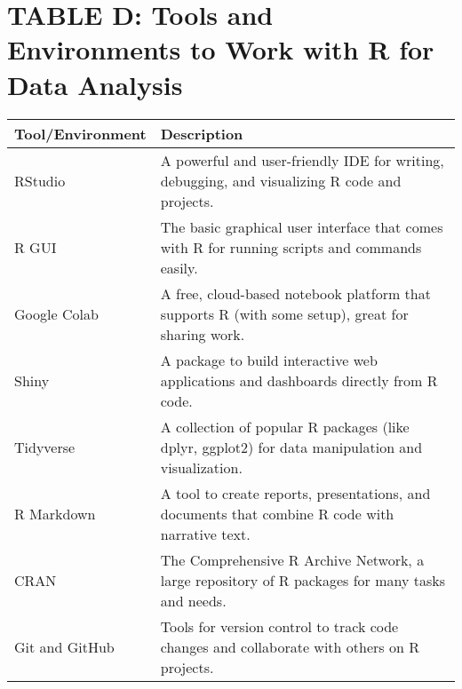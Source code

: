 \section*{TABLE D: Tools and Environments to Work with R for Data Analysis}

\begin{table}[h!]
\centering
\begin{tabular}{|p{4cm}|p{10cm}|}
\hline
\textbf{Tool/Environment} & \textbf{Description} \\
\hline
RStudio & A powerful and user-friendly IDE for writing, debugging, and visualizing R code and projects. \\
\hline
R GUI & The basic graphical user interface that comes with R for running scripts and commands easily. \\
\hline
Google Colab & A free, cloud-based notebook platform that supports R (with some setup), great for sharing work. \\
\hline
Shiny & A package to build interactive web applications and dashboards directly from R code. \\
\hline
Tidyverse & A collection of popular R packages (like dplyr, ggplot2) for data manipulation and visualization. \\
\hline
R Markdown & A tool to create reports, presentations, and documents that combine R code with narrative text. \\
\hline
CRAN & The Comprehensive R Archive Network, a large repository of R packages for many tasks and needs. \\
\hline
Git and GitHub & Tools for version control to track code changes and collaborate with others on R projects. \\
\hline
\end{tabular}
\label{tab:tools_environments}
\end{table}
